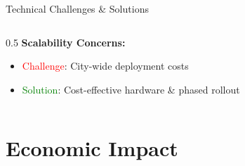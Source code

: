\documentclass[10pt]{beamer}
\begin{document}
\begin{frame}{Technical Challenges \& Solutions}
\begin{columns}
\begin{column}{0.5\textwidth}
            \vspace{0.2cm}
            \textbf{Scalability Concerns:}
            \begin{itemize}
                \item \textcolor{red}{Challenge}: City-wide deployment costs
                \item \textcolor{green}{Solution}: Cost-effective hardware \& phased rollout
            \end{itemize}
        \end{column}
    \end{columns}
\end{frame}

\section{Economic Impact}
\end{document}
